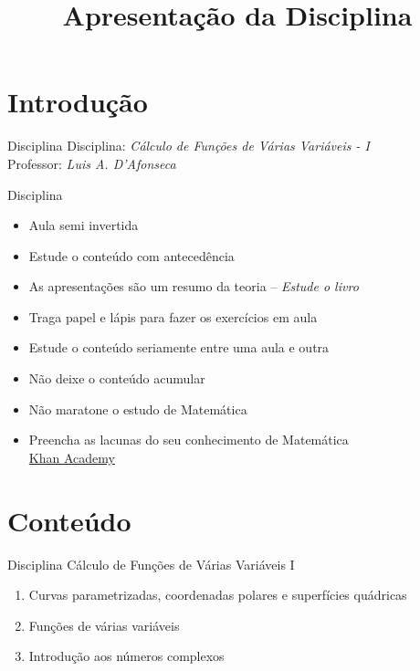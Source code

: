 \documentclass[fleqn,utf8,aspectratio=169,12pt,ignorenonframetext]{beamer}
\title{Apresentação da Disciplina}
\begin{document}
\addtitle

\section{Introdução}

\begin{frame}{Disciplina}
   Disciplina: \emph{\large Cálculo de Funções de Várias Variáveis - I}\\[7mm]
   Professor: \emph{\large Luis A. D'Afonseca}
\end{frame}

\begin{frame}{Disciplina}
\begin{itemize}[<+->]
  \item Aula semi invertida
  \item Estude o conteúdo com antecedência
  \item As apresentações são um resumo da teoria -- \emph{Estude o livro}
  \item Traga papel e lápis para fazer os exercícios em aula
  \item Estude o conteúdo seriamente entre uma aula e outra
  \item Não deixe o conteúdo acumular
  \item Não maratone o estudo de Matemática
  \item Preencha as lacunas do seu conhecimento de Matemática \\
        \href{https://pt.khanacademy.org}{Khan Academy}
\end{itemize}
\end{frame}

\section{Conteúdo}


\begin{frame}{Disciplina}
  Cálculo de Funções de Várias Variáveis I
  \begin{enumerate}[<+->]
    \item Curvas parametrizadas, coordenadas polares e superfícies quádricas
    \item Funções de várias variáveis
    \item Introdução aos números complexos
  \end{enumerate}
\end{frame}
\end{document}

